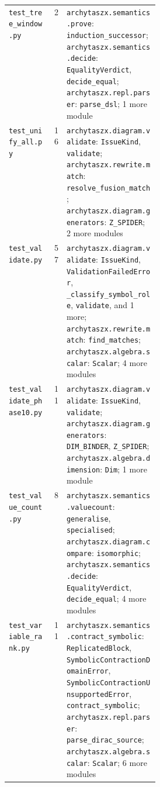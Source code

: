 \begin{xltabular}{\linewidth}{@{}>{\raggedright\arraybackslash}p{0.3\linewidth}r>{\raggedright\arraybackslash}X@{}}
\texttt{test\_\allowbreak{}tree\_\allowbreak{}window.py} & 2 & \texttt{archytaszx.\allowbreak{}semantics.\allowbreak{}prove}: \texttt{induction\_\allowbreak{}successor}; \texttt{archytaszx.\allowbreak{}semantics.\allowbreak{}decide}: \texttt{EqualityVerdict}, \texttt{decide\_\allowbreak{}equal}; \texttt{archytaszx.\allowbreak{}repl.\allowbreak{}parser}: \texttt{parse\_\allowbreak{}dsl}; 1 more module \\
\texttt{test\_\allowbreak{}unify\_\allowbreak{}all.py} & 16 & \texttt{archytaszx.\allowbreak{}diagram.\allowbreak{}validate}: \texttt{IssueKind}, \texttt{validate}; \texttt{archytaszx.\allowbreak{}rewrite.\allowbreak{}match}: \texttt{resolve\_\allowbreak{}fusion\_\allowbreak{}match}; \texttt{archytaszx.\allowbreak{}diagram.\allowbreak{}generators}: \texttt{Z\_\allowbreak{}SPIDER}; 2 more modules \\
\texttt{test\_\allowbreak{}validate.py} & 57 & \texttt{archytaszx.\allowbreak{}diagram.\allowbreak{}validate}: \texttt{IssueKind}, \texttt{ValidationFailedError}, \texttt{\_\allowbreak{}classify\_\allowbreak{}symbol\_\allowbreak{}role}, \texttt{validate}, and 1 more; \texttt{archytaszx.\allowbreak{}rewrite.\allowbreak{}match}: \texttt{find\_\allowbreak{}matches}; \texttt{archytaszx.\allowbreak{}algebra.\allowbreak{}scalar}: \texttt{Scalar}; 4 more modules \\
\texttt{test\_\allowbreak{}validate\_\allowbreak{}phase10.py} & 11 & \texttt{archytaszx.\allowbreak{}diagram.\allowbreak{}validate}: \texttt{IssueKind}, \texttt{validate}; \texttt{archytaszx.\allowbreak{}diagram.\allowbreak{}generators}: \texttt{DIM\_\allowbreak{}BINDER}, \texttt{Z\_\allowbreak{}SPIDER}; \texttt{archytaszx.\allowbreak{}algebra.\allowbreak{}dimension}: \texttt{Dim}; 1 more module \\
\texttt{test\_\allowbreak{}value\_\allowbreak{}count.py} & 8 & \texttt{archytaszx.\allowbreak{}semantics.\allowbreak{}valuecount}: \texttt{generalise}, \texttt{specialised}; \texttt{archytaszx.\allowbreak{}diagram.\allowbreak{}compare}: \texttt{isomorphic}; \texttt{archytaszx.\allowbreak{}semantics.\allowbreak{}decide}: \texttt{EqualityVerdict}, \texttt{decide\_\allowbreak{}equal}; 4 more modules \\
\texttt{test\_\allowbreak{}variable\_\allowbreak{}rank.py} & 11 & \texttt{archytaszx.\allowbreak{}semantics.\allowbreak{}contract\_\allowbreak{}symbolic}: \texttt{ReplicatedBlock}, \texttt{SymbolicContractionDomainError}, \texttt{SymbolicContractionUnsupportedError}, \texttt{contract\_\allowbreak{}symbolic}; \texttt{archytaszx.\allowbreak{}repl.\allowbreak{}parser}: \texttt{parse\_\allowbreak{}dirac\_\allowbreak{}source}; \texttt{archytaszx.\allowbreak{}algebra.\allowbreak{}scalar}: \texttt{Scalar}; 6 more modules \\

\end{xltabular}
